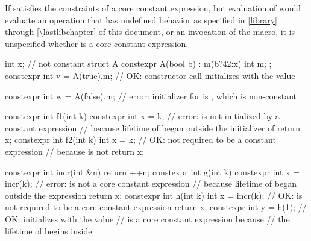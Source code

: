 If  satisfies the constraints of a core constant expression, but
evaluation of  would evaluate an operation that has undefined behavior
as specified in \ref{library} through \ref{\lastlibchapter} of this document, or
an invocation of the  macro,
it is unspecified whether  is a core constant expression.

\begin{example}
\begin{codeblock}
int x;                              // not constant
struct A {
  constexpr A(bool b) : m(b?42:x) { }
  int m;
};
constexpr int v = A(true).m;        // OK: constructor call initializes  with the value 

constexpr int w = A(false).m;       // error: initializer for  is , which is non-constant

constexpr int f1(int k) {
  constexpr int x = k;              // error:  is not initialized by a constant expression
                                    // because lifetime of  began outside the initializer of 
  return x;
}
constexpr int f2(int k) {
  int x = k;                        // OK: not required to be a constant expression
                                    // because  is not 
  return x;
}

constexpr int incr(int &n) {
  return ++n;
}
constexpr int g(int k) {
  constexpr int x = incr(k);        // error:  is not a core constant expression
                                    // because lifetime of  began outside the expression 
  return x;
}
constexpr int h(int k) {
  int x = incr(k);                  // OK:  is not required to be a core constant expression
  return x;
}
constexpr int y = h(1);             // OK: initializes  with the value 
                                    //  is a core constant expression because
                                    // the lifetime of  begins inside 
\end{codeblock}
\end{example}


